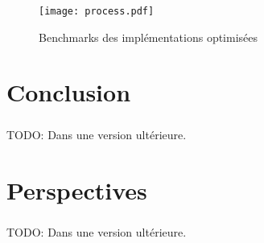\documentclass{report}
\begin{document}
\begin{figure}[H]
	\centering
	\texttt{[image: process.pdf]}%
	\label{fig:process}
	\caption{Benchmarks des implémentations optimisées}
\end{figure}

\chapter{Conclusion}

\paragraph{} TODO: Dans une version ultérieure.

\chapter{Perspectives}

\paragraph{} TODO: Dans une version ultérieure.

\listoffigures
\listoflistings
\listoftables
\end{document}

